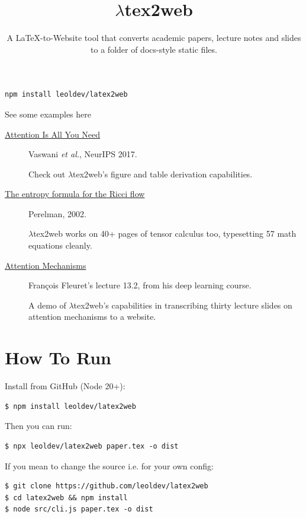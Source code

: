 \documentclass[11pt]{article}
\title{\texorpdfstring{$\lambda$tex2web}{latex2web}}
\author{A LaTeX-to-Website tool that converts academic papers, lecture notes and
slides to a folder of docs-style static files.}
\date{}
\begin{document}
\maketitle

\begin{verbatim}
npm install leoldev/latex2web
\end{verbatim}

See some examples here

\begin{description}
  \item[\href{site/ms.html}{Attention Is All You Need}]
    Vaswani \emph{et al.}, NeurIPS 2017.

    Check out $\lambda$tex2web's figure and table derivation capabilities.

  \item[\href{site/src.html}{The entropy formula for the Ricci flow}]
    Perelman, 2002.

    $\lambda$tex2web works on 40+ pages of tensor calculus too, typesetting 57
    math equations cleanly.

  \item[\href{site/dlc-slides-13-2-attention-mechanisms.html}{Attention Mechanisms}]
    Fran\c{c}ois Fleuret's lecture 13.2, from his deep learning course.

    A demo of $\lambda$tex2web's capabilities in transcribing thirty lecture slides
    on attention mechanisms to a website.
\end{description}

\section{How To Run}

Install from GitHub (Node 20+):

\begin{verbatim}
$ npm install leoldev/latex2web
\end{verbatim}

Then you can run:

\begin{verbatim}
$ npx leoldev/latex2web paper.tex -o dist
\end{verbatim}

If you mean to change the source i.e. for your own config:

\begin{verbatim}
$ git clone https://github.com/leoldev/latex2web
$ cd latex2web && npm install
$ node src/cli.js paper.tex -o dist
\end{verbatim}
\end{document}
